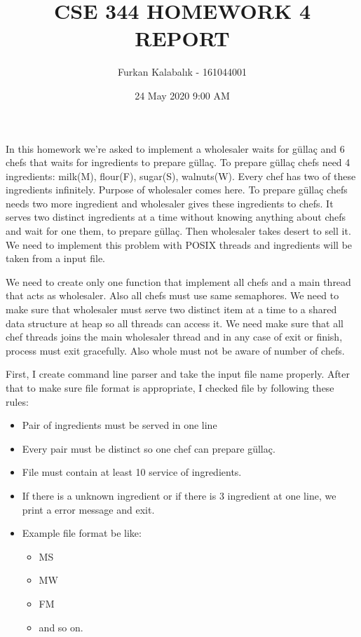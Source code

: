 \documentclass[twocolumn]{article}
\title{CSE 344 HOMEWORK 4 REPORT}
\author{Furkan Kalabalık - 161044001}
\affil{Gebze Technical University\\
	Computer Science and Engineering Department}
\date{24 May 2020 9:00 AM}
\begin{document}
\maketitle        

\renewcommand{\abstractname}{Introduction}

In this homework we're asked to implement a wholesaler waits for güllaç and 6 chefs that waits for ingredients to prepare güllaç. To prepare güllaç chefs need 4 ingredients: milk(M), flour(F), sugar(S), walnuts(W). Every chef has two of these ingredients infinitely. Purpose of wholesaler comes here. To prepare güllaç chefs needs two more ingredient and wholesaler gives these ingredients to chefs. It serves two distinct ingredients at a time without knowing anything about chefs and wait for one them, to prepare güllaç. Then wholesaler takes desert to sell it. We need to implement this problem with POSIX threads and ingredients will be taken from a input file.

We need to create only one function that implement all chefs and a main thread that acts as wholesaler. Also all chefs must use same semaphores. We need to make sure that wholesaler must serve two distinct item at a time to a shared data structure at heap so all threads can access it. We need make sure that all chef threads joins the main wholesaler thread and in any case of exit or finish, process must exit gracefully. Also whole must not be aware of number of chefs.

First, I create command line parser and take the input file name properly. After that to make sure file format is appropriate, I checked file by following these rules:
\begin{itemize}
    \item Pair of ingredients must be served in one line
    \item Every pair must be distinct so one chef can prepare güllaç.
    \item File must contain at least 10 service of ingredients.
    \item If there is a unknown ingredient or if there is 3 ingredient at one line, we print a error message and exit.
    \item Example file format be like:
    \begin{itemize}
        \item MS
        \item MW
        \item FM 
        \item and so on.
    \end{itemize}
\end{itemize}
\end{document}
